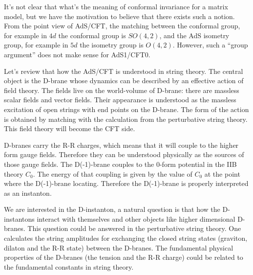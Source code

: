 
It's not clear that what's the meaning of conformal invariance for a matrix model, but we have the motivation to believe that there exists such a notion.
From the point view of AdS/CFT, the matching between the conformal group,
for example in $4d$ the conformal group is $SO(4,2)$, and the AdS isometry group, for example in $5d$ the isometry group is $O(4,2)$.
However, such a ``group argument'' does not make sense for AdS1/CFT0.

Let's review that how the AdS/CFT is understood in string theory.
The central object is the D-brane whose dynamics can be described by an effective action of field theory.
The fields live on the world-volume of D-brane: there are massless scalar fields and vector fields.
Their appearance is understood as the massless excitation of open strings with end points on the D-brane.
The form of the action is obtained by matching with the calculation from the perturbative string theory.
This field theory will become the CFT side.



D-branes carry the R-R charges, 
which means that it will couple to the higher form gauge fields.
Therefore they can be understood physically 
as the sources of those gauge fields.
The D(-1)-brane couples to the 0-form potential in the IIB theory $C_0$.
The energy of that coupling is given by the value of $C_0$ at the point where the D(-1)-brane locating.
Therefore the D(-1)-brane is properly interpreted as an instanton.

We are interested in the D-instanton,
a natural question is that how the D-instantons interact with themselves
and other objects like higher dimensional D-branes.
This question could be answered in the perturbative string theory.
One calculates the string amplitudes for exchanging the closed string states (graviton, dilaton and the R-R state) between the D-branes.
The fundamental physical properties of the D-branes 
(the tension and the R-R charge)
could be related to the fundamental constants in string theory.


